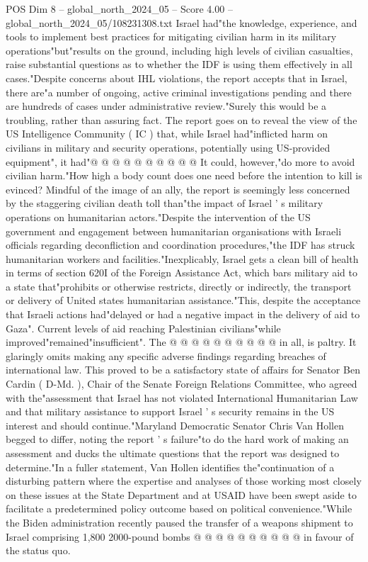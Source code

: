 \begin{textsample}{POS Dim 8 – global\_north\_2024\_05 – Score 4.00 – global\_north\_2024\_05/108231308.txt}
Israel had"the knowledge, experience, and tools to implement best practices for mitigating civilian harm in its military operations"but"results on the ground, including high levels of civilian casualties, raise substantial questions as to whether the IDF is using them effectively in all cases."Despite concerns about IHL violations, the report accepts that in Israel, there are"a number of ongoing, active criminal investigations pending and there are hundreds of cases under administrative review."Surely this would be a troubling, rather than assuring fact.
The report goes on to reveal the view of the US Intelligence Community ( IC ) that, while Israel had"inflicted harm on civilians in military and security operations, potentially using US-provided equipment", it had"@ @ @ @ @ @ @ @ @ @ It could, however,"do more to avoid civilian harm."How high a body count does one need before the intention to kill is evinced?
Mindful of the image of an ally, the report is seemingly less concerned by the staggering civilian death toll than"the impact of Israel ' s military operations on humanitarian actors."Despite the intervention of the US government and engagement between humanitarian organisations with Israeli officials regarding deconfliction and coordination procedures,"the IDF has struck humanitarian workers and facilities."Inexplicably, Israel gets a clean bill of health in terms of section 620I of the Foreign Assistance Act, which bars military aid to a state that"prohibits or otherwise restricts, directly or indirectly, the transport or delivery of United states humanitarian assistance."This, despite the acceptance that Israeli actions had"delayed or had a negative impact in the delivery of aid to Gaza".
Current levels of aid reaching Palestinian civilians"while improved"remained"insufficient".
The @ @ @ @ @ @ @ @ @ @ in all, is paltry.
It glaringly omits making any specific adverse findings regarding breaches of international law.
This proved to be a satisfactory state of affairs for Senator Ben Cardin ( D-Md. ), Chair of the Senate Foreign Relations Committee, who agreed with the"assessment that Israel has not violated International Humanitarian Law and that military assistance to support Israel ' s security remains in the US interest and should continue."Maryland Democratic Senator Chris Van Hollen begged to differ, noting the report ' s failure"to do the hard work of making an assessment and ducks the ultimate questions that the report was designed to determine."In a fuller statement, Van Hollen identifies the"continuation of a disturbing pattern where the expertise and analyses of those working most closely on these issues at the State Department and at USAID have been swept aside to facilitate a predetermined policy outcome based on political convenience."While the Biden administration recently paused the transfer of a weapons shipment to Israel comprising 1,800 2000-pound bombs @ @ @ @ @ @ @ @ @ @ in favour of the status quo.

\end{textsample}
